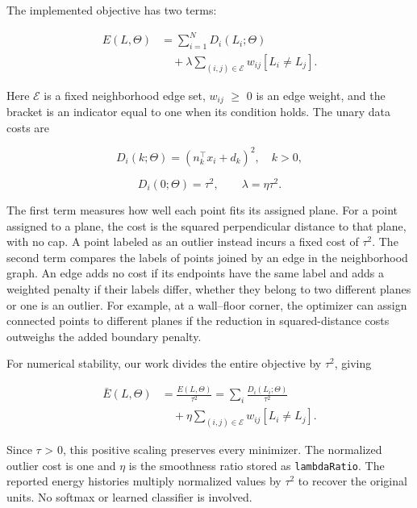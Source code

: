The implemented objective has two terms:

\begin{equation}
\begin{aligned}E(L,\Theta)&=\sum_{i=1}^{N}D_i(L_i;\Theta)\\&\quad+\lambda\sum_{(i,j)\in\mathcal E}w_{ij}[L_i\ne L_j].\end{aligned}
\label{eq:14}
\end{equation}

Here \(\mathcal E\) is a fixed neighborhood edge set, \(w_{ij}\) \(\geq\) 0 is an edge weight, and the bracket is an indicator equal to one when its condition holds. The unary data costs are

\begin{equation}
D_i(k;\Theta)=(n_k^\top x_i+d_k)^2,\quad k>0,
\label{eq:15}
\end{equation}

\begin{equation}
D_i(0;\Theta)=\tau^2,\qquad\lambda=\eta\tau^2.
\label{eq:16}
\end{equation}

The first term measures how well each point fits its assigned plane. For a point assigned to a plane, the cost is the squared perpendicular distance to that plane, with no cap. A point labeled as an outlier instead incurs a fixed cost of \(\tau^{2}\). The second term compares the labels of points joined by an edge in the neighborhood graph. An edge adds no cost if its endpoints have the same label and adds a weighted penalty if their labels differ, whether they belong to two different planes or one is an outlier. For example, at a wall--floor corner, the optimizer can assign connected points to different planes if the reduction in squared-distance costs outweighs the added boundary penalty.

For numerical stability, our work divides the entire objective by \(\tau^{2}\), giving

\begin{equation}
\begin{aligned}\bar E(L,\Theta)&=\frac{E(L,\Theta)}{\tau^2}=\sum_i\frac{D_i(L_i;\Theta)}{\tau^2}\\&\quad+\eta\sum_{(i,j)\in\mathcal E}w_{ij}[L_i\ne L_j].\end{aligned}
\label{eq:17}
\end{equation}

Since \(\tau\) \textgreater{} 0, this positive scaling preserves every minimizer. The normalized outlier cost is one and \(\eta\) is the smoothness ratio stored as \texttt{lambdaRatio}. The reported energy histories multiply normalized values by \(\tau^{2}\) to recover the original units. No softmax or learned classifier is involved.


